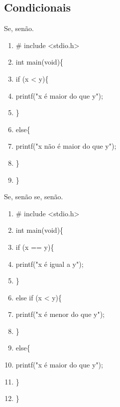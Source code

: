 \documentclass[12pt,a4paper]{article} %
\begin{document}
\subsection{Condicionais}
Se, senão.
\begin{enumerate}
\item \# include <stdio.h>
\item int main(void)\{
\item \tabto{1.1cm}if (x < y)\{
\item \tabto{2.2cm}printf("x é maior do que y");
\item \tabto{1.1cm}\}
\item \tabto{1.1cm}else\{
\item \tabto{2.2cm}printf("x não é maior do que y");
\item \tabto{1.1cm}\}
\item \}
\end{enumerate}
Se, senão se, senão.
\begin{enumerate}
\item \# include <stdio.h>
\item int main(void)\{
\item \tabto{1.1cm}if (x == y)\{
\item \tabto{2.2cm}printf("x é igual a y");
\item \tabto{1.1cm}\}
\item \tabto{1.1cm}else if (x < y)\{
\item \tabto{2.2cm}printf("x é menor do que y");
\item \tabto{1.1cm}\}
\item \tabto{1.1cm}else\{
\item \tabto{2.2cm}printf("x é maior do que y");
\item \tabto{1.1cm}\}
\item \}
\end{enumerate}
\end{document}
